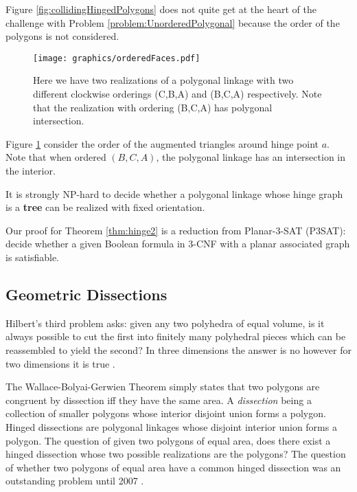 Figure \ref{fig:collidingHingedPolygons} does not quite get at the heart of the challenge with Problem \ref{problem:UnorderedPolygonal} because the order of the polygons is not considered.
\begin{figure}[!htbp]\label{fig:orderedFaces.pdf}
\begin{center}
\texttt{[image: graphics/orderedFaces.pdf]}
\caption{Here we have two realizations of a polygonal linkage with two different clockwise orderings (C,B,A) and (B,C,A) respectively.  Note that the realization with ordering (B,C,A) has polygonal intersection.}
\end{center} 
\end{figure}
Figure \ref{fig:orderedFaces.pdf} consider the order of the augmented triangles around hinge point $a$.  Note that when ordered $(B,C,A)$, the polygonal linkage has an intersection in the interior. 






\begin{thm}\label{thm:hinge2}
It is strongly NP-hard to decide whether a polygonal linkage whose hinge graph is a \textbf{tree} can be realized with fixed orientation.
\end{thm}

Our proof for Theorem \ref{thm:hinge2} is a reduction from {\sc Planar-3-SAT} (P3SAT): decide whether a given Boolean formula in 3-CNF with a planar associated graph is satisfiable. 




\subsection{Geometric Dissections}
Hilbert's third problem asks: given any two polyhedra of equal volume, is it always possible to cut the first into finitely many polyhedral pieces which can be reassembled to yield the second\cite{aigner2010hilbert}?  In three dimensions the answer is no however for two dimensions it is true \cite{10.23073621846}.

The Wallace-Bolyai-Gerwien Theorem simply states that two polygons are congruent by dissection iff they have the same area.  
A \textit{dissection} being a collection of smaller polygons whose interior disjoint union forms a polygon.
Hinged dissections are polygonal linkages whose disjoint interior union forms a polygon.  
The question of given two polygons of equal area, does there exist a hinged dissection whose two possible realizations are the polygons?
The question of whether two polygons of equal area have a common hinged dissection was an outstanding problem until 2007 \cite{abbott2012hinged}.


